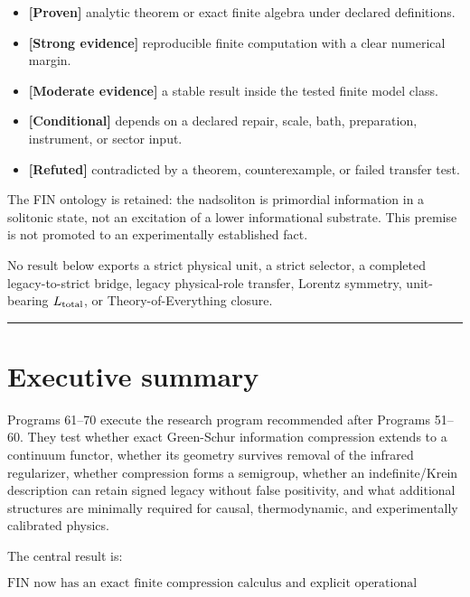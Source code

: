 \documentclass[11pt,a4paper,openany]{report}
\newcommand{\statusProven}{\textcolor{fingreen}{[Proven]}}
\newcommand{\statusStrong}{\textcolor{finblue}{[Strong evidence]}}
\newcommand{\statusModerate}{\textcolor{finviolet}{[Moderate evidence]}}
\newcommand{\statusConditional}{\textcolor{finorange}{[Conditional]}}
\newcommand{\statusRefuted}{\textcolor{finred}{[Refuted]}}
\begin{document}
\begin{itemize}
\item 
\textbf{\statusProven{}} analytic theorem or exact finite algebra under declared definitions.

\item 
\textbf{\statusStrong{}} reproducible finite computation with a clear numerical margin.

\item 
\textbf{\statusModerate{}} a stable result inside the tested finite model class.

\item 
\textbf{\statusConditional{}} depends on a declared repair, scale, bath, preparation, instrument, or sector input.

\item 
\textbf{\statusRefuted{}} contradicted by a theorem, counterexample, or failed transfer test.

\end{itemize}

The FIN ontology is retained: the nadsoliton is primordial information in a solitonic state, not an excitation of a lower informational substrate. This premise is not promoted to an experimentally established fact.

No result below exports a strict physical unit, a strict selector, a completed legacy-to-strict bridge, legacy physical-role transfer, Lorentz symmetry, unit-bearing \(L_{\rm total}\), or Theory-of-Everything closure.

\par\medskip\hrule\medskip

\chapter{Executive summary}

Programs 61–70 execute the research program recommended after Programs 51–60. They test whether exact Green-Schur information compression extends to a continuum functor, whether its geometry survives removal of the infrared regularizer, whether compression forms a semigroup, whether an indefinite/\allowbreak{}Krein description can retain signed legacy without false positivity, and what additional structures are minimally required for causal, thermodynamic, and experimentally calibrated physics.

The central result is:

\[
\boxed{
\text{FIN now has an exact finite compression calculus and explicit operational bridges,}
}
\]
\end{document}
